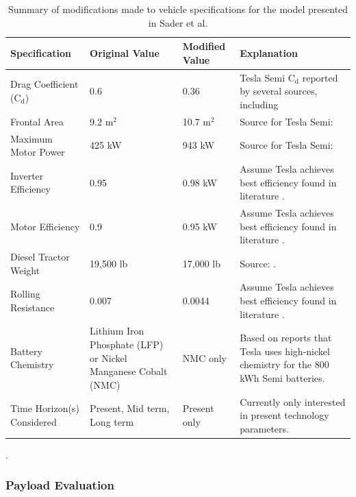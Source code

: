 \begin{table}[H]
\centering
\begin{tabular}{P{3.5cm}P{3.5cm}P{3.5cm}P{5cm}} %
\toprule %
\textbf{Specification} & \textbf{Original Value} & \textbf{Modified Value} & \textbf{Explanation} \\ 
\midrule %
Drag Coefficient (C$_\text{d}$) & 0.6 & 0.36 & Tesla Semi C$_\text{d}$ reported by several sources, including \cite{notateslaapp2024} \\
\midrule 
Frontal Area & 9.2 m$^2$ & 10.7 m$^2$ & Source for Tesla Semi: \cite{motormatchup2022} \\
\midrule 
Maximum Motor Power & 425 kW & 943 kW & Source for Tesla Semi: \cite{motormatchup2022} \\
\midrule 
Inverter Efficiency & 0.95 & 0.98 kW & Assume Tesla achieves best efficiency found in literature \cite{Poorfakhraei_et_al_2021}. \\
\midrule 
Motor Efficiency & 0.9 & 0.95 kW & Assume Tesla achieves best efficiency found in literature \cite{Sergaki_et_al_2012}. \\
\midrule 
Diesel Tractor Weight & 19,500 lb & 17,000 lb & Source: \cite{doe2010}. \\
\midrule 
Rolling Resistance & 0.007 & 0.0044 & Assume Tesla achieves best efficiency found in literature \cite{Paterlini_et_al_2015}. \\
\midrule 
Battery Chemistry & Lithium Iron Phosphate (LFP) or Nickel Manganese Cobalt (NMC) & NMC only & Based on reports \cite{charlton2023} that Tesla uses high-nickel chemistry for the 800 kWh Semi batteries. \\
\midrule
Time Horizon(s) Considered & Present, Mid term, Long term & Present only & Currently only interested in present technology parameters. \\
\bottomrule %
\end{tabular}
\caption{Summary of modifications made to vehicle specifications for the model presented in Sader et al. \cite{Sader_2023}}.
\label{tab:model_parameter_mods}
\end{table}

\subsubsection{Payload Evaluation}
\label{sec:payload_evaluation}

